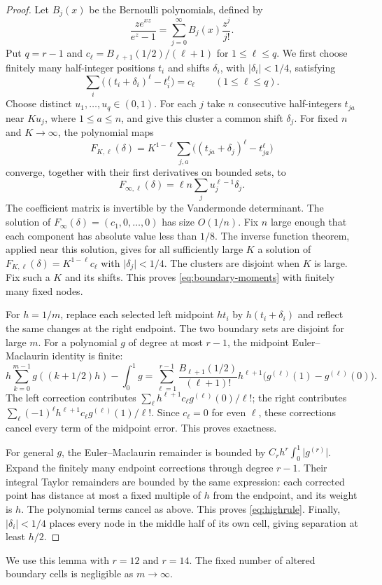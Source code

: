 \documentclass[11pt,a4paper]{article}
\theoremstyle{definition}
\newcommand{\abs}[1]{\lvert#1\rvert}
\numberwithin{equation}{section}
\begin{document}
\begin{proof}
Let $B_j(x)$ be the Bernoulli polynomials, defined by
\[
 \frac{ze^{xz}}{e^z-1}=\sum_{j=0}^{\infty}B_j(x)\frac{z^j}{j!}.
\]
Put $q=r-1$ and $c_\ell=B_{\ell+1}(1/2)/(\ell+1)$ for $1\le\ell\le q$. We first choose finitely many half-integer positions $t_i$ and shifts $\delta_i$, with $\abs{\delta_i}<1/4$, satisfying
\begin{equation}\label{eq:boundary-moments}
 \sum_i\bigl((t_i+\delta_i)^\ell-t_i^\ell\bigr)=c_\ell
 \qquad(1\le\ell\le q).
\end{equation}
Choose distinct $u_1,\ldots,u_q\in(0,1)$. For each $j$ take $n$ consecutive half-integers $t_{ja}$ near $Ku_j$, where $1\le a\le n$, and give this cluster a common shift $\delta_j$. For fixed $n$ and $K\to\infty$, the polynomial maps
\[
 F_{K,\ell}(\delta)=K^{1-\ell}
 \sum_{j,a}\bigl((t_{ja}+\delta_j)^\ell-t_{ja}^\ell\bigr)
\]
converge, together with their first derivatives on bounded sets, to
\[
 F_{\infty,\ell}(\delta)=\ell n\sum_j u_j^{\ell-1}\delta_j.
\]
The coefficient matrix is invertible by the Vandermonde determinant. The solution of
$F_\infty(\delta)=(c_1,0,\ldots,0)$ has size $O(1/n)$. Fix $n$ large enough that each component has absolute value less than $1/8$. The inverse function theorem, applied near this solution, gives for all sufficiently large $K$ a solution of
$F_{K,\ell}(\delta)=K^{1-\ell}c_\ell$ with $\abs{\delta_j}<1/4$. The clusters are disjoint when $K$ is large. Fix such a $K$ and its shifts. This proves \eqref{eq:boundary-moments} with finitely many fixed nodes.

For $h=1/m$, replace each selected left midpoint $ht_i$ by $h(t_i+\delta_i)$ and reflect the same changes at the right endpoint. The two boundary sets are disjoint for large $m$. For a polynomial $g$ of degree at most $r-1$, the midpoint Euler--Maclaurin identity is finite:
\[
 h\sum_{k=0}^{m-1}g((k+1/2)h)-\int_0^1g
 =\sum_{\ell=1}^{r-1}\frac{B_{\ell+1}(1/2)}{(\ell+1)!}
 h^{\ell+1}\bigl(g^{(\ell)}(1)-g^{(\ell)}(0)\bigr).
\]
The left correction contributes
$\sum_\ell h^{\ell+1}c_\ell g^{(\ell)}(0)/\ell!$;
the right contributes
$\sum_\ell(-1)^\ell h^{\ell+1}c_\ell g^{(\ell)}(1)/\ell!$.
Since $c_\ell=0$ for even $\ell$, these corrections cancel every term of the midpoint error. This proves exactness.

For general $g$, the Euler--Maclaurin remainder is bounded by
$C_rh^r\int_0^1\abs{g^{(r)}}$. Expand the finitely many endpoint corrections through degree $r-1$. Their integral Taylor remainders are bounded by the same expression: each corrected point has distance at most a fixed multiple of $h$ from the endpoint, and its weight is $h$. The polynomial terms cancel as above. This proves \eqref{eq:highrule}. Finally, $\abs{\delta_i}<1/4$ places every node in the middle half of its own cell, giving separation at least $h/2$.
\end{proof}
We use this lemma with $r=12$ and $r=14$. The fixed number of altered boundary cells is negligible as $m\to\infty$.
\end{document}

